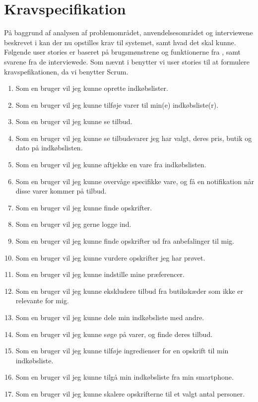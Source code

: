 \section{Kravspecifikation}

På baggrund af analysen af problemområdet, anvendelsesområdet og interviewene beskrevet i   kan der nu opstilles krav til systemet, samt hvad det skal kunne.
Følgende user stories er baseret på brugsmønstrene og funktionerne fra , samt svarene fra de interviewede.
Som nævnt i  benytter vi user stories til at formulere kravspefikationen, da vi benytter Scrum.
\begin{enumerate}
	\item Som en bruger vil jeg kunne oprette indkøbslister.
	\item Som en bruger vil jeg kunne tilføje varer til min(e) indkøbsliste(r).
	\item Som en bruger vil jeg kunne se tilbud.
	\item Som en bruger vil jeg kunne se tilbudsvarer jeg har valgt, deres pris, butik og dato på indkøbslisten.
	\item Som en bruger vil jeg kunne aftjekke en vare fra indkøbslisten.
	\item Som en bruger vil jeg kunne overvåge specifikke vare, og få en notifikation når disse varer kommer på tilbud.
	\item Som en bruger vil jeg kunne finde opskrifter.
	\item Som en bruger vil jeg gerne logge ind.
	\item Som en bruger vil jeg kunne finde opskrifter ud fra anbefalinger til mig.
	\item Som en bruger vil jeg kunne vurdere opskrifter jeg har prøvet.
	\item Som en bruger vil jeg kunne indstille mine præferencer.
	\item Som en bruger vil jeg kunne ekskludere tilbud fra butikskæder som ikke er relevante for mig.
	\item Som en bruger vil jeg kunne dele min indkøbsliste med andre.
	\item Som en bruger vil jeg kunne søge på varer, og finde deres tilbud.
	\item Som en bruger vil jeg kunne tilføje ingredienser for en opskrift til min indkøbsliste.
	\item Som en bruger vil jeg kunne tilgå min indkøbsliste fra min smartphone.
	\item Som en bruger vil jeg kunne skalere opskrifterne til et valgt antal personer.
\end{enumerate}

